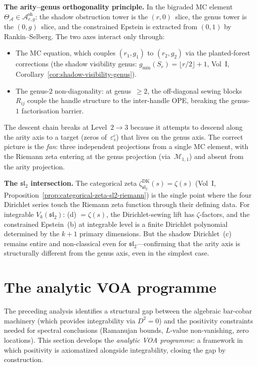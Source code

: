 \documentclass[11pt]{article}
\newcommand{\cA}{\mathcal{A}}
\newcommand{\cM}{\mathcal{M}}
\newcommand{\fsl}{\mathfrak{sl}}
\begin{document}
\textbf{The arity--genus orthogonality principle.}
In the bigraded MC element
$\Theta_\cA \in \cA^{\mathrm{sh}}_{r,g}$:
the shadow obstruction tower is the $(r, 0)$~slice, the genus
tower is the $(0, g)$~slice, and the constrained Epstein is
extracted from $(0, 1)$ by Rankin--Selberg.  The two axes
interact only through:
\begin{itemize}[nosep]
\item The MC equation, which couples $(r_1, g_1)$ to
  $(r_2, g_2)$ via the planted-forest corrections
  (the shadow visibility genus:
  $g_{\min}(S_r) = \lfloor r/2 \rfloor + 1$,
  Vol~I, Corollary~\ref*{cor:shadow-visibility-genus}).
\item The genus-$2$ non-diagonality: at genus~$\geq 2$,
  the off-diagonal sewing blocks~$R_{ij}$ couple the
  handle structure to the inter-handle OPE, breaking the
  genus-$1$ factorisation barrier.
\end{itemize}
The descent chain breaks at Level~$2 \to 3$ because it
attempts to descend along the arity axis to a target (zeros
of~$\varepsilon^c_s$) that lives on the genus axis.
The correct picture is the \emph{fan}: three independent
projections from a single MC element, with the Riemann zeta
entering at the genus projection (via~$\cM_{1,1}$) and absent
from the arity projection.

\textbf{The $\fsl_2$ intersection.}
The categorical zeta $\zeta^{\mathrm{DK}}_{\fsl_2}(s) = \zeta(s)$
(Vol~I, Proposition~\ref*{prop:categorical-zeta-sl2-riemann})
is the single point where the four Dirichlet series touch the
Riemann zeta function through their defining data.  For integrable
$V_k(\fsl_2)$: (d) $= \zeta(s)$, the Dirichlet-sewing lift
has $\zeta$-factors, and the constrained Epstein~(b) at integrable
level is a finite Dirichlet polynomial determined by the $k{+}1$
primary dimensions.  But the shadow Dirichlet~(c) remains entire
and non-classical even for $\fsl_2$---confirming that the arity
axis is structurally different from the genus axis, even in the
simplest case.


\section{The analytic VOA programme}
\label{sec:analytic-voa-programme}

The preceding analysis identifies a structural gap between the
algebraic bar-cobar machinery (which provides integrability via
$D^2 = 0$) and the positivity constraints needed for spectral
conclusions (Ramanujan bounds, $L$-value non-vanishing, zero
locations).  This section develops the \emph{analytic VOA
programme}: a framework in which positivity is axiomatized
alongside integrability, closing the gap by construction.
\end{document}
